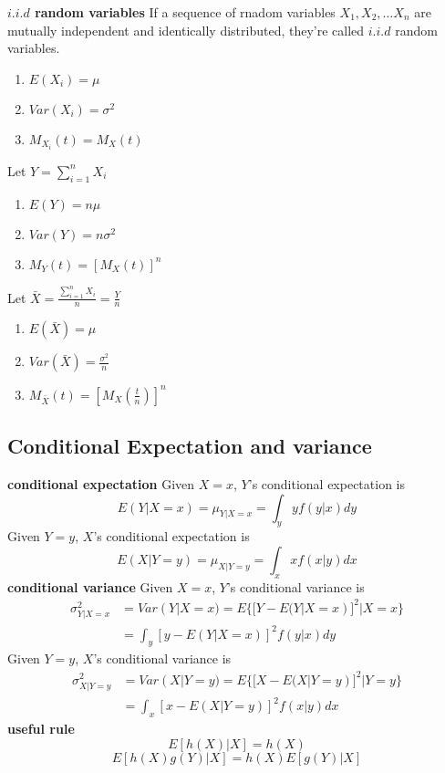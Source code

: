 \documentclass[12pt]{article}
\begin{document}
\textbf{$i.i.d$ random variables}
\newline
If a sequence of rnadom variables ${X_1,X_2,\ldots X_n}$ are mutually independent and identically distributed, they're called $i.i.d$ random variables.
\begin{enumerate}
    \item $E(X_i)=\mu$
    \item $Var(X_i)=\sigma^2$
    \item $M_{X_i}(t)=M_X(t)$
\end{enumerate}
Let $Y=\sum_{i=1}^n X_i$
\begin{enumerate}
    \item $E(Y)=n\mu$
    \item $Var(Y)=n\sigma^2$
    \item $M_Y(t)=[M_X(t)]^n$
\end{enumerate}
Let $\bar X=\frac{\sum_{i=1}^n X_i}{n}=\frac{Y}{n}$
\begin{enumerate}
    \item $E(\bar X)=\mu$
    \item $Var(\bar X)=\frac{\sigma^2}{n}$
    \item $M_{\bar X}(t)=[M_X(\frac{t}{n})]^n$
\end{enumerate}
\subsection*{Conditional Expectation and variance}
\textbf{conditional expectation}
\newline
Given $X=x$, $Y$'s conditional expectation is
\begin{equation}
    E(Y|X=x)=\mu_{Y|X=x}=\int_y yf(y|x)dy
\end{equation}
Given $Y=y$, $X$'s conditional expectation is
\begin{equation}
    E(X|Y=y)=\mu_{X|Y=y}=\int_x xf(x|y)dx
\end{equation}
\textbf{conditional variance}
\newline
Given $X=x$, $Y$'s conditional variance is
\begin{equation}
    \begin{aligned}
        \sigma^2_{Y|X=x}&=Var(Y|X=x)=E\{[Y-E(Y|X=x)]^2|X=x\}\\&=\int_y[y-E(Y|X=x)]^2f(y|x)dy
    \end{aligned}
\end{equation}
Given $Y=y$, $X$'s conditional variance is
\begin{equation}
    \begin{aligned}
        \sigma^2_{X|Y=y}&=Var(X|Y=y)=E\{[X-E(X|Y=y)]^2|Y=y\}\\&=\int_x[x-E(X|Y=y)]^2f(x|y)dx
    \end{aligned}
\end{equation}
\textbf{useful rule}
\begin{equation}
    E[h(X)|X]=h(X)
\end{equation}
\begin{equation}
    E[h(X)g(Y)|X]=h(X)E[g(Y)|X]
\end{equation}
\end{document}
